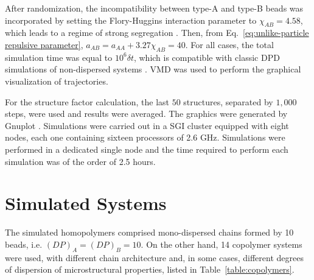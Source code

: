 \documentclass[
journal=mamobx,
manuscript=article,
]{achemso}
\begin{document}
After randomization, the incompatibility between type-A and type-B beads was incorporated by setting the Flory-Huggins interaction parameter to $\chi_{AB} = 4.58$, which leads to a regime of strong segregation \cite{Hamley_1998}.
Then, from Eq.~\eqref{eq:unlike-particle repulsive parameter}, $a_{AB} = a_{AA} + 3.27 \chi_{AB} = 40$.
For all cases, the total simulation time was equal to $10^6 \delta t$, which is compatible with classic DPD simulations of non-dispersed systems \cite{Groot_1998}.
VMD \cite{Humphrey_1996} was used to perform the graphical visualization of trajectories.

For the structure factor calculation, the last $50$ structures, separated by $1,000$ steps, were used and results were averaged.
The graphics were generated by Gnuplot \cite{Williams_2013}.
Simulations were carried out in a SGI cluster equipped with eight nodes, each one containing sixteen processors of 2.6 GHz.
Simulations were performed in a dedicated single node and the time required to perform each simulation was of the order of 2.5 hours.

\section{Simulated Systems}
\label{sec:simulated systems}

The simulated homopolymers comprised mono-dispersed chains formed by 10 beads, i.e. $(DP)_A = (DP)_B = 10$.
On the other hand, 14 copolymer systems were used, with different chain architecture and, in some cases, different degrees  of dispersion of microstructural properties, listed in Table~\ref{table:copolymers}. 
\end{document}
